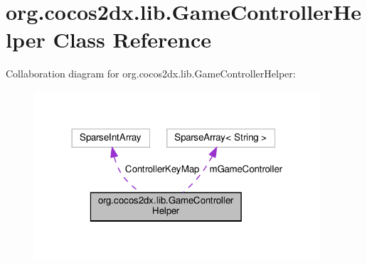 \hypertarget{classorg_1_1cocos2dx_1_1lib_1_1GameControllerHelper}{}\section{org.\+cocos2dx.\+lib.\+Game\+Controller\+Helper Class Reference}
\label{classorg_1_1cocos2dx_1_1lib_1_1GameControllerHelper}


Collaboration diagram for org.\+cocos2dx.\+lib.\+Game\+Controller\+Helper\+:
\nopagebreak
\begin{figure}[H]
\begin{center}
\leavevmode
\includegraphics[width=302pt]{classorg_1_1cocos2dx_1_1lib_1_1GameControllerHelper__coll__graph}
\end{center}
\end{figure}
